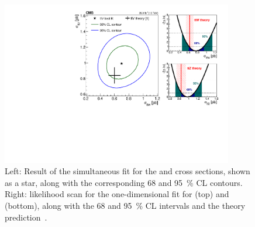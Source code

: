 \begin{table}
  \centering
  \caption{Post-fit yields for the SS \ttW channel ($D < 0$)}
  \label{tab:13-yields-2lss-CR}
  
\end{table}
\begin{table}
  \centering
  \caption{Post-fit yields for the SS \ttW channel ($D > 0$)}
  \label{tab:13-yields-2lss-SR}
  
\end{table}
\begin{table}
  \centering
  \caption{Post-fit yields for the 3\lep \ttZ channel}
  \label{tab:13-yields-3l}
  
\end{table}
\begin{table}
  \centering
  \caption{Post-fit yields for the 4\lep \ttZ channel}
  \label{tab:13-yields-4l}
  
\end{table}
\begin{table}
  
\end{table}
\begin{figure}
    \includegraphics[width=0.90\textwidth]{figures/thirteen-TeV/sm-2d}
    \caption[Simultaneous fit for the \ttW and \ttZ cross sections]{Left: Result of the simultaneous fit for the \ttW and \ttZ cross sections, shown as a star, along with the corresponding 68 and \SI{95}{\percent} CL contours. Right: likelihood scan for the one-dimensional fit for \ttW (top) and \ttZ (bottom), along with the 68 and \SI{95}{\percent} CL intervals and the theory prediction~\cite{deFlorian:2016spz}.}
    \label{fig:13-sm-2d}
\end{figure}

